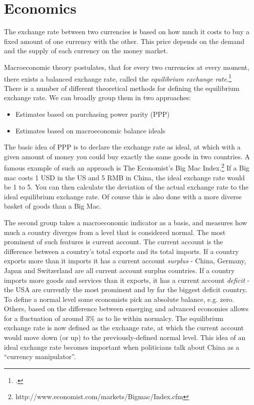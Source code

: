 \section{Economics}

The exchange rate between two currencies is based on how much it 
costs to buy a fixed amount of one currency with the other. This price 
depends on the demand and the supply of each currency on the money market. 

Macroeconomic theory postulates, that for every two currencies at every 
moment, there exists a balanced exchange rate, called the 
\emph{equilibrium exchange rate}.\footnote{\cite[pp.  
505]{Krugman2008}.} There is a number of different theoretical methods 
for defining the equilibrium exchange rate. We can broadly group them in 
two approaches: 

\begin{itemize}
\item{Estimates based on purchasing power parity (PPP)}
\item{Estimates based on macroeconomic balance ideals}
\end{itemize}

The basic idea of PPP is to declare the exchange rate as ideal, at which 
with a given amount of money you could buy exactly the same goods in two 
countries. A famous example of such an approach is The Economist's Big 
Mac Index.\footnote{http://www.economist.com/markets/Bigmac/Index.cfm} 
If a Big mac costs 1 USD in the US and 5 RMB in China, the ideal 
exchange rate would be 1 to 5. You can then calculate the deviation of 
the actual exchange rate to the ideal equilibrium exchange rate. Of 
course this is also done with a more diverse basket of goods than a Big 
Mac. 

The second group takes a macroeconomic indicator as a basis, and 
measures how much a country diverges from a level that is considered 
normal.  The most prominent of such features is current account.  The 
current account is the difference between a country's total exports and 
its total imports.  If a country exports more than it imports it has a 
current account \emph{surplus} - China, Germany, Japan and Switzerland 
are all current account surplus countries. If a country imports more 
goods and services than it exports, it has a current account 
\emph{deficit} - the USA are currently the most prominent and by far the 
biggest deficit country. To define a normal level some economists pick 
an absolute balance, e.g. zero.  Others, based on the difference between 
emerging and advanced economies allows for a fluctuation of around 3\% 
as to lie within normalcy.  The equilibrium exchange rate is now defined 
as the exchange rate, at which the current account would move down (or 
up) to the previously-defined normal level. This idea of an ideal 
exchange rate becomes important when politicians talk about China as a 
``currency manipulator''.

